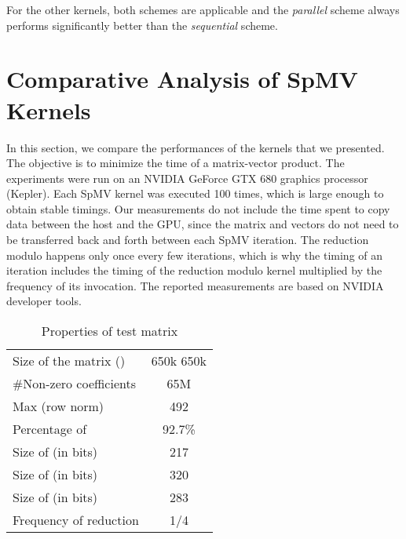\documentclass[runningheads,orivec]{llncs}
\begin{document}
\medskip
For the other kernels, both schemes are applicable and the \textit{parallel} scheme always performs significantly better than the \textit{sequential} scheme.

\vspace*{-0.25cm}

\section{Comparative Analysis of SpMV Kernels}
\label{results}
In this section, we compare the performances of the kernels that we presented. The objective is to minimize the time of a matrix-vector product. The experiments were run on an NVIDIA GeForce GTX 680 graphics processor (Kepler). Each SpMV kernel was executed 100 times, which is large enough to obtain stable timings.
Our measurements do not include the time spent to copy data between the host and the GPU, since the matrix and vectors do not need to be transferred back and forth between each SpMV iteration. The reduction modulo  happens only once every few iterations, which is why the timing of an iteration includes the timing of the reduction modulo  kernel multiplied by the frequency of its invocation. The reported measurements are based on NVIDIA developer tools.



\begin{wraptable}[8]{r}{6.25cm}
\vspace*{-1cm}
  \centering
    \begin{tabular}{|l||c|}
      \hline
      \small Size of the matrix () & \footnotesize 650k  650k\\
      \small \#Non-zero coefficients & \footnotesize 65M\\
      \small Max (row norm) &\footnotesize 492\\
      \small Percentage of  & \footnotesize 92.7\%\\
      \small Size of  (in bits)& \footnotesize 217\\
      \small Size of  (in bits)& \footnotesize 320\\
      \small Size of  (in bits)& \footnotesize 283\\
      \small Frequency of reduction  & \footnotesize 1/4\\      
      \hline
    \end{tabular}
  \caption{ \small{Properties of test matrix}}
  \label{Matrices}
\end{wraptable}
\end{document}
